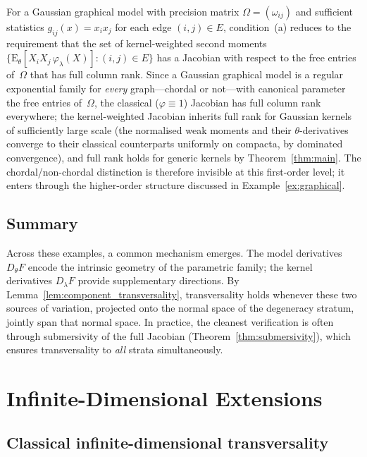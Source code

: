 \documentclass[11pt,a4paper]{article}
\newcommand{\E}{\mathrm{E}}
\begin{document}
For a Gaussian graphical model with precision matrix
$\Omega = (\omega_{ij})$ and sufficient statistics
$g_{ij}(x) = x_i x_j$ for each edge $(i,j) \in E$,
condition~(a) reduces to the requirement that the set of
kernel-weighted second moments
$\{\E_\theta[X_i X_j\,\varphi_\lambda(X)] : (i,j)\in E\}$ has
a Jacobian with respect to the free entries of~$\Omega$ that has
full column rank.  Since a Gaussian graphical model is a regular
exponential family for \emph{every} graph---chordal or not---with
canonical parameter the free entries of~$\Omega$, the classical
($\varphi \equiv 1$) Jacobian has full column rank everywhere; the
kernel-weighted Jacobian inherits full rank for Gaussian kernels of
sufficiently large scale (the normalised weak moments and their
$\theta$-derivatives converge to their classical counterparts
uniformly on compacta, by dominated convergence), and full rank holds
for generic kernels by Theorem~\ref{thm:main}.  The
chordal/non-chordal distinction is therefore invisible at this
first-order level; it enters through the higher-order structure
discussed in Example~\ref{ex:graphical}.


\subsection{Summary}

Across these examples, a common mechanism emerges.  The model
derivatives $D_\theta F$ encode the intrinsic geometry of the
parametric family; the kernel derivatives $D_\lambda F$ provide
supplementary directions.  By
Lemma~\ref{lem:component_transversality}, transversality holds
whenever these two sources of variation, projected onto the normal
space of the degeneracy stratum, jointly span that normal space.
In practice, the cleanest verification is often through
submersivity of the full Jacobian
(Theorem~\ref{thm:submersivity}), which ensures transversality to
\emph{all} strata simultaneously.


\section{Infinite-Dimensional Extensions}
\label{sec:infinite_dim}

\subsection{Classical infinite-dimensional transversality}
\end{document}
